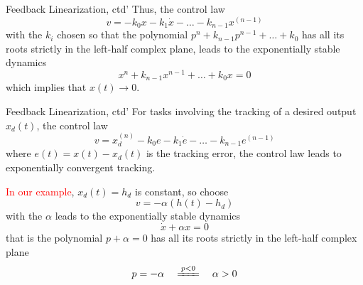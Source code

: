 \documentclass{beamer}
\begin{document}
  
  \begin{frame}{Feedback Linearization, ctd'}
    Thus, the control law
    $$ v = -k_{0}x-k_{1}\dot{x}- \dots - k_{n-1}x^{(n-1)} $$
    with the $k_{i}$ chosen so that the polynomial $p^{n}+k_{n-1}p^{n-1} + \dots + k_{0}$ has all its roots strictly in the left-half complex plane, leads to the exponentially stable dynamics
    $$
    x^{n}+k_{n-1}x^{n-1}+\dots+k_{0}x = 0
    $$
    which implies that $x(t) \rightarrow 0$.
  \end{frame}
  
  \begin{frame}{Feedback Linearization, ctd'}
    For tasks involving the tracking of a desired output $x_{d}(t)$, the control law
    \begin{equation}\label{tracking}
      v = x_{d}^{(n)} - k_{0}e - k_{1}\dot{e}-\dots-k_{n-1}e^{(n-1)}
    \end{equation}
    where $e(t) = x(t)-x_{d}(t)$ is the tracking error, the control law leads to exponentially convergent tracking.
    \par \vspace{-5pt}
    \textcolor{red}{In our example}, $x_{d}(t)=h_{d}$ is constant, so choose 
    $$v=-\alpha(h(t) - h_{d})$$
    with the $\alpha$ leads to the exponentially stable dynamics
    $$
    \dot{x} + \alpha x=0
    $$
    that is the polynomial $p+\alpha=0$ has all its roots strictly in the left-half complex plane
    $$
    p = -\alpha \quad \xlongequal{p < 0} \quad \alpha > 0
    $$

  \end{frame}
  
  
\end{document}
